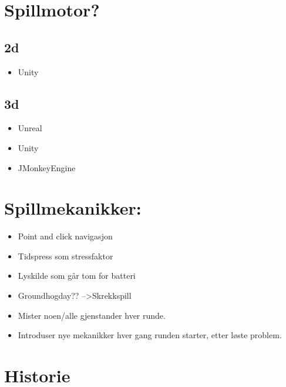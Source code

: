\documentclass[a4paper]{article}
\begin{document}
\section{Spillmotor?}

\subsection{2d}
\begin{itemize}
    \item Unity
\end{itemize}

\subsection{3d}
\begin{itemize}
    \item Unreal
    \item Unity
    \item JMonkeyEngine
\end{itemize}

\section{Spillmekanikker:}
\begin{itemize}
    \item Point and click navigasjon
    \item Tidspress som stressfaktor
    \item Lyskilde som går tom for batteri
    \item Groundhogday?? -->Skrekkspill
    \item Mister noen/alle gjenstander hver runde.
    \item Introduser nye mekanikker hver gang runden starter, etter løste problem.
\end{itemize}

\section{Historie}
\end{document}
